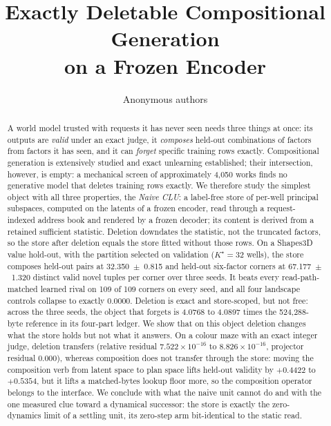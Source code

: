 \documentclass{article} %
\title{Exactly Deletable Compositional Generation\\ on a Frozen Encoder}
\author{Anonymous authors}
\newcommand{\sci}[2]{\ensuremath{#1\times10^{#2}}}
\newcommand{\Kstar}{\ensuremath{K^{\star}}}
\begin{document}
\maketitle

\begin{abstract}
A world model trusted with requests it has never seen needs three things at once: its outputs are \emph{valid} under an exact judge, it \emph{composes}
held-out combinations of factors from factors it has seen, and it can \emph{forget} specific
training rows exactly. Compositional generation is extensively studied and exact unlearning established; their intersection, however, is empty: a mechanical
screen of approximately 4,050 works finds no generative model that deletes training rows
exactly. %
We therefore study the simplest object with all three properties, the \emph{Naive CLU}: a
label-free store of per-well principal subspaces, computed on the latents of a frozen
encoder, read through a request-indexed address book and rendered by a frozen decoder; its
content is derived from a retained sufficient statistic. Deletion downdates the statistic, not the truncated factors, so the store after deletion equals the store fitted without those rows.
On a Shapes3D value hold-out, with the partition selected on validation ($\Kstar=32$ wells),
the store composes held-out pairs at 32.350~$\pm$~0.815 and held-out six-factor corners at
67.177~$\pm$~1.320 distinct valid novel tuples per corner over three seeds. It beats every
read-path-matched learned rival on 109 of 109 corners on every seed, and all four landscape
controls collapse to exactly 0.0000. %
Deletion is exact and store-scoped, but not free: across the three seeds, the object
that forgets is 4.0768 to 4.0897 times the 524,288-byte reference in its four-part ledger. We show that on this object deletion changes what the store holds but not what it answers.
On a colour maze with an exact integer judge, deletion transfers
(relative residual \sci{7.522}{-16} to \sci{8.826}{-16}, projector residual 0.000), %
whereas composition does not transfer through the store: moving the composition verb from
latent space to plan space lifts held-out validity by $+0.4422$ to $+0.5354$, but it lifts a matched-bytes lookup floor more, so the composition operator belongs to the interface.
We conclude with what the naive unit cannot do and with the one measured clue toward a
dynamical successor: the store is exactly the zero-dynamics limit of a settling unit, its zero-step arm bit-identical to the static read. %
\end{abstract}
\end{document}
